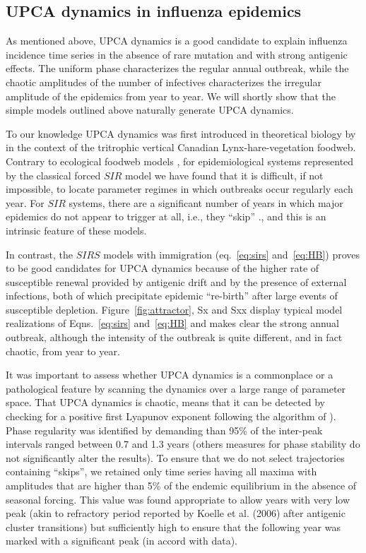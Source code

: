 \documentclass[12pt]{article}
\begin{document}
\subsection{UPCA dynamics in influenza epidemics}
\label{sec:res_upca}

As mentioned above, UPCA dynamics is a good candidate to explain
influenza incidence time series in the absence of rare mutation and
with strong antigenic effects. The uniform phase characterizes the
regular annual outbreak, while the chaotic amplitudes of the number of
infectives characterizes the irregular amplitude of the epidemics from
year to year.  We will shortly show that the simple models outlined
above naturally generate UPCA dynamics.

To our knowledge UPCA dynamics was first introduced in theoretical
biology by \citet{Blasius1999} in the context of the tritrophic
vertical Canadian Lynx-hare-vegetation foodweb.  Contrary to
ecological foodweb models \citep{Stone2007}, for epidemiological
systems represented by the classical forced $SIR$ model we have found
that it is difficult, if not impossible, to locate parameter regimes
in which outbreaks occur regularly each year. For $SIR$ systems, there
are a significant number of years in which major epidemics do not
appear to trigger at all, i.e., they ``skip'' \citep{Stone2007a,
  Olinky2008}., and this is an intrinsic feature of these models.

In contrast, the $SIRS$ models with immigration (eq.~\eqref{eq:sirs}
and~\eqref{eq:HB}) proves to be good candidates for UPCA dynamics
because of the higher rate of susceptible renewal provided by
antigenic drift and by the presence of external infections, both of
which precipitate epidemic ``re-birth'' after large events of
susceptible depletion.  Figure~\ref{fig:attractor}, Sx and Sxx display
typical model realizations of Eqns.~\eqref{eq:sirs} and~\eqref{eq:HB}
and makes clear the strong annual outbreak, although the intensity of
the outbreak is quite different, and in fact chaotic, from year to
year.

It was important to assess whether UPCA dynamics is a commonplace or a
pathological feature by scanning the dynamics over a large range of
parameter space. That UPCA dynamics is chaotic, means that it can be
detected by checking for a positive first Lyapunov exponent following
the algorithm of \citep{Wolf1985}).
Phase regularity was identified by demanding than 95\% of the
inter-peak intervals ranged between 0.7 and 1.3 years (others measures
for phase stability do not significantly alter the results). To ensure
that we do not select trajectories containing ``skips'', we retained
only time series having all maxima with amplitudes that are higher
than 5\% of the endemic equilibrium in the absence of seasonal
forcing. This value was found appropriate to allow years with very low
peak (akin to refractory period reported by Koelle et al. (2006) after
antigenic cluster transitions) but sufficiently high to ensure that
the following year was marked with a significant peak (in accord with
data).
\end{document}
